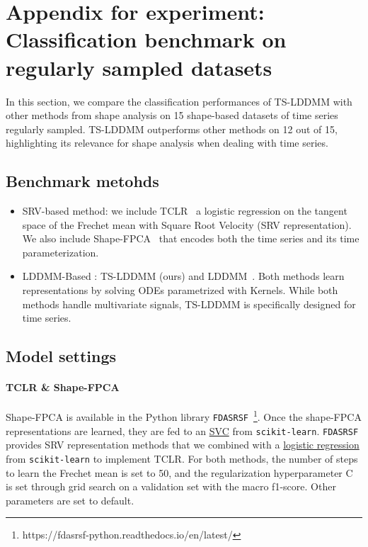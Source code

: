 \section{Appendix for experiment: Classification benchmark on regularly sampled datasets}
\label{appendix: shape_classification}

In this section, we compare the classification performances of TS-LDDMM with other methods from shape analysis on 15 shape-based datasets of time series regularly sampled. TS-LDDMM outperforms other methods on 12 out of 15, highlighting its relevance for shape analysis when dealing with time series. 


\subsection{Benchmark metohds}
\begin{itemize}
  \item SRV-based method: we include TCLR~\cite{heo2024logistic} a logistic regression on the tangent space of the Frechet mean with Square Root Velocity (SRV representation). We also include Shape-FPCA~\cite{wu2024shape} that encodes both the time series and its time parameterization. 
  \item LDDMM-Based : TS-LDDMM (ours) and LDDMM~\cite{glaunes2008large}. Both methods learn representations by solving ODEs parametrized with Kernels. While both methods handle multivariate signals, TS-LDDMM is specifically designed for time series.
 \end{itemize}

\subsection{Model settings}

\paragraph{TCLR \& Shape-FPCA}
Shape-FPCA is available in the Python library \texttt{FDASRSF}~\footnote{https://fdasrsf-python.readthedocs.io/en/latest/}. Once the shape-FPCA representations are learned, they are fed to an \href{https://scikit-learn.org/stable/modules/generated/sklearn.svm.SVC.html#sklearn.svm.SVC}{SVC} from \texttt{scikit-learn}. \texttt{FDASRSF} provides SRV representation methods that we combined with a \href{https://scikit-learn.org/stable/modules/generated/sklearn.linear_model.LogisticRegressionCV.html}{logistic regression} from \texttt{scikit-learn} to implement TCLR. For both methods, the number of steps to learn the Frechet mean is set to 50, and the regularization hyperparameter C is set through grid search on a validation set with the macro f1-score. Other parameters are set to default.  

